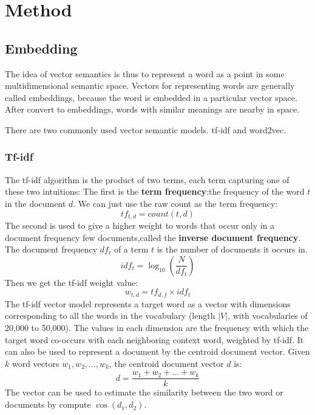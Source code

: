 \section{Method} \label{sec-method}
\subsection{Embedding}
The idea of vector semantics is thus to represent a word as a point in some multidimensional semantic space.
Vectors for representing words are generally called embeddings, because the word is embedded in a particular vector space.
After convert to embeddings, words with similar meanings are nearby in space.

There are two commonly used vector semantic models. tf-idf and word2vec.
\subsubsection{Tf-idf}
The tf-idf algorithm is the product
of two terms, each term capturing one of these two intuitions:
The first is the \textbf{term frequency}:the frequency of the word $t$ in the
document $d$. We can just use the raw count as the term frequency:
\begin{equation}
    tf_{t,d}=count(t,d)
\end{equation}
The second is used to give a higher weight to words that occur only in a
document frequency few documents,called the \textbf{inverse document frequency}. 
The document frequency $df_t$ of a term $t$ is the number of documents it occurs in.
\begin{equation}
    idf_t = \log_{10}{(\frac{N}{df_t})}
\end{equation}
Then we get the tf-idf weight value:
\begin{equation}
    w_{t,d}=tf_{d,f}\times idf_t
\end{equation}
The tf-idf vector model represents a target word as a vector with dimensions 
corresponding to all the words in the vocabulary (length $|V|$, with vocabularies of 20,000 to 50,000).
The values in each dimension are the frequency with which the target 
word co-occurs with each neighboring context word, weighted by tf-idf.
It can also be used to represent a document by the centroid document vector.
Given $k$ word vectors $w_1, w_2, \dots, w_k$, the centroid document vector $d$ is:
\begin{equation}
    d = \frac{w_1+w_2+\dots+w_k}{k}
\end{equation}
The vector can be used to estimate the similarity between the two word or documents by
compute $\cos{(d_1, d_2)}$.

